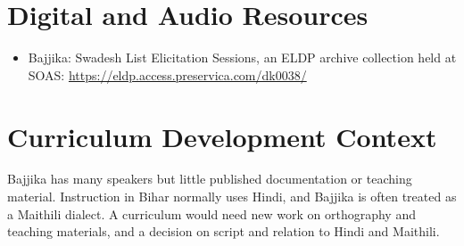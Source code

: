 \documentclass[12pt]{article}
\begin{document}
\section{Digital and Audio Resources}
\begin{itemize}
\item Bajjika: Swadesh List Elicitation Sessions, an ELDP archive collection held at SOAS: \url{https://eldp.access.preservica.com/dk0038/}
\end{itemize}

\section{Curriculum Development Context}
Bajjika has many speakers but little published documentation or teaching material. Instruction in Bihar normally uses Hindi, and Bajjika is often treated as a Maithili dialect. A curriculum would need new work on orthography and teaching materials, and a decision on script and relation to Hindi and Maithili.
\end{document}
